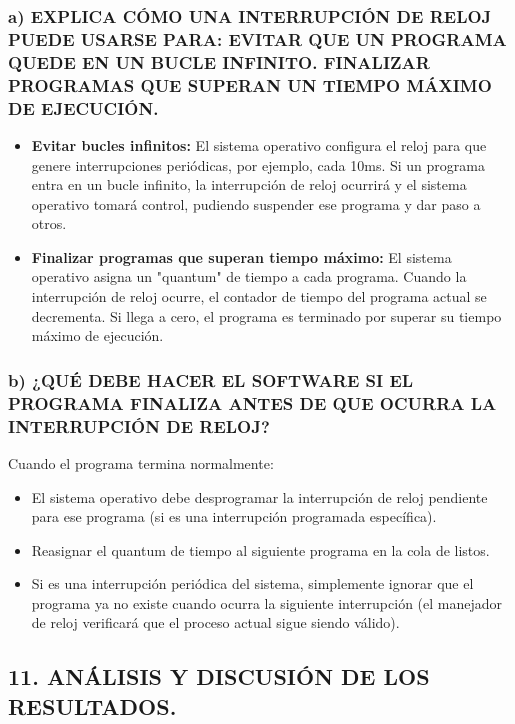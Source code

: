 \documentclass[12pt]{article}
\begin{document}
\subsubsection*{a) EXPLICA CÓMO UNA INTERRUPCIÓN DE RELOJ PUEDE USARSE PARA: EVITAR QUE UN PROGRAMA QUEDE EN UN BUCLE INFINITO. FINALIZAR PROGRAMAS QUE SUPERAN UN TIEMPO MÁXIMO DE EJECUCIÓN.}

\begin{itemize}
    \item \textbf{Evitar bucles infinitos:} El sistema operativo configura el reloj para que genere interrupciones periódicas, por ejemplo, cada 10ms. Si un programa entra en un bucle infinito, la interrupción de reloj ocurrirá y el sistema operativo tomará control, pudiendo suspender ese programa y dar paso a otros.
    
    \item \textbf{Finalizar programas que superan tiempo máximo:} El sistema operativo asigna un "quantum" de tiempo a cada programa. Cuando la interrupción de reloj ocurre, el contador de tiempo del programa actual se decrementa. Si llega a cero, el programa es terminado por superar su tiempo máximo de ejecución.
\end{itemize}

\subsubsection*{b) ¿QUÉ DEBE HACER EL SOFTWARE SI EL PROGRAMA FINALIZA ANTES DE QUE OCURRA LA INTERRUPCIÓN DE RELOJ?}

Cuando el programa termina normalmente:
\begin{itemize}
    \item El sistema operativo debe desprogramar la interrupción de reloj pendiente para ese programa (si es una interrupción programada específica).
    \item Reasignar el quantum de tiempo al siguiente programa en la cola de listos.
    \item Si es una interrupción periódica del sistema, simplemente ignorar que el programa ya no existe cuando ocurra la siguiente interrupción (el manejador de reloj verificará que el proceso actual sigue siendo válido).
\end{itemize}

\subsection*{11. ANÁLISIS Y DISCUSIÓN DE LOS RESULTADOS.}
\end{document}
